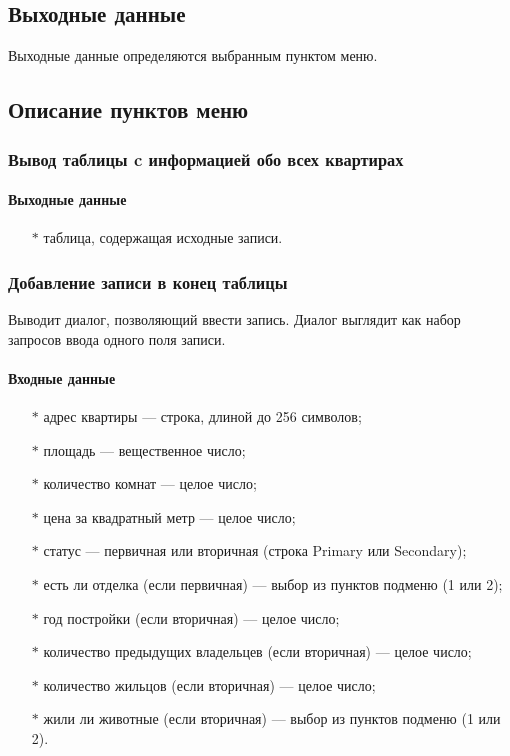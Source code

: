 \documentclass[a4paper,12pt]{extarticle}
\begin{document}
\subsection{Выходные данные}
Выходные данные определяются выбранным пунктом меню.

\subsection{Описание пунктов меню}
\subsubsection{Вывод таблицы c информацией обо всех квартирах}
\paragraph{Выходные данные}
\begin{itemize}
    \item[$*$] таблица, содержащая исходные записи.
\end{itemize}

\subsubsection{Добавление записи в конец таблицы}
Выводит диалог, позволяющий ввести запись. Диалог выглядит как набор запросов ввода одного поля записи.
\paragraph{Входные данные}
\begin{itemize}
    \item[$*$] адрес квартиры --- строка, длиной до 256 символов;
    \item[$*$] площадь --- вещественное число;
    \item[$*$] количество комнат --- целое число;
    \item[$*$] цена за квадратный метр --- целое число;
    \item[$*$] статус --- первичная или вторичная (строка Primary или Secondary);
    \item[$*$] есть ли отделка (если первичная) --- выбор из пунктов подменю (1 или 2);
    \item[$*$] год постройки (если вторичная) --- целое число;
    \item[$*$] количество предыдущих владельцев (если вторичная) --- целое число;
    \item[$*$] количество жильцов (если вторичная) --- целое число;
    \item[$*$] жили ли животные (если вторичная) --- выбор из пунктов подменю (1 или 2).
\end{itemize}
\end{document}
